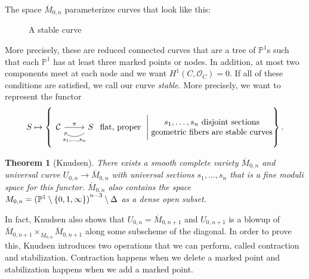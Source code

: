 \documentclass[leqno, openany]{memoir}
\newtheorem{thm}{Theorem}[section]
\theoremstyle{definition}
\theoremstyle{remark}
\theoremstyle{plain}
\theoremstyle{definition}
\theoremstyle{remark}
\renewcommand{\P}{\mathbb{P}}
\newcommand{\mc}[1]{\mathcal{#1}}
\newcommand{\ol}[1]{\overline{#1}}
\begin{document}
The space $\ol{M}_{0,n}$ parameterizes curves that look like this:
\begin{figure}[H]
\begin{center}
\end{center}
\caption{A stable curve}%
\label{fig:stabcurve}
\end{figure}
More precisely, these are reduced connected curves that are a tree of $\P^1$s such that each $\P^1$ has at least three marked points or nodes. In addition, at most two components meet at each node and we want $H^1(C, \mc{O}_C) = 0$. If all of these conditions are satisfied, we call our curve \textit{stable}. More precisely, we want to represent the functor
\[ S \mapsto \left\{ 
\begin{tikzcd}
    \mc{C} \ar{r}{\pi} & S \ar[bend left=40]{l}{s_1, \ldots, s_n}   
\end{tikzcd} \text{ flat, proper } \Biggm\vert \Centerstack{ {$s_1, \ldots, s_n$ disjoint sections} {geometric fibers are stable curves} }
\right\}. \]

\begin{thm}[Knudsen]
    There exists a smooth complete variety $\ol{M}_{0,n}$ and universal curve $U_{0,n} \to \ol{M}_{0,n}$ with universal sections $s_1, \ldots, s_n$ that is a fine moduli space for this functor. $\ol{M}_{0,n}$ also contains the space $M_{0,n} = {(\P^1 \setminus \qty{0,1,\infty})}^{n-3} \setminus \Delta$ as a dense open subset.
\end{thm}

In fact, Knudsen also shows that $U_{0,n} = \ol{M}_{0, n+1}$ and $U_{0,n+1}$ is a blowup of $\ol{M}_{0,n+1} \times_{\ol{M}_{0,n}} \ol{M}_{0,n+1}$ along some subscheme of the diagonal. In order to prove this, Knudsen introduces two operations that we can perform, called contraction and stabilization. Contraction happens when we delete a marked point and stabilization happens when we add a marked point.
\end{document}
